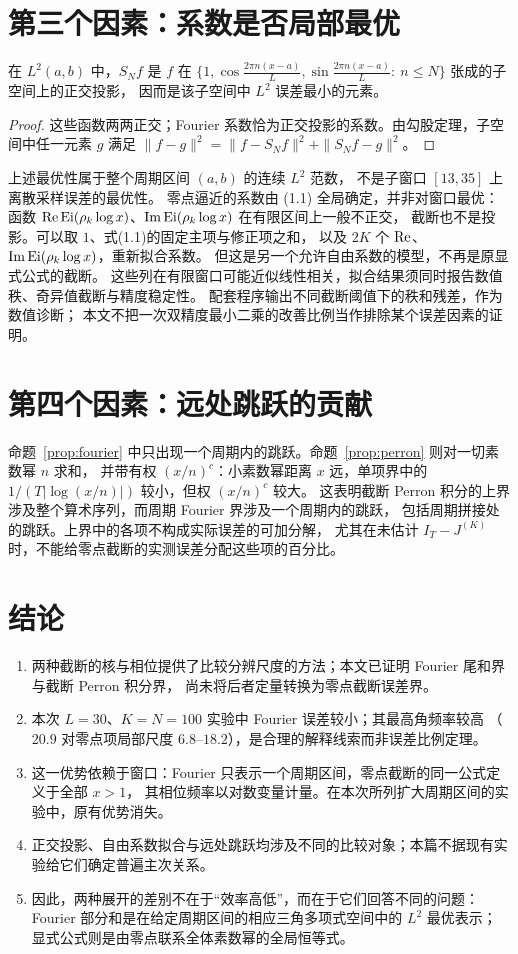 \documentclass[11pt]{article}
\newcommand{\Ei}{\operatorname{Ei}}
\begin{document}
\section{第三个因素：系数是否局部最优}
\begin{proposition}\label{prop:proj}
在 $L^2(a,b)$ 中，$S_Nf$ 是 $f$ 在 $\{1,\cos\frac{2\pi n(x-a)}L,\sin\frac{2\pi n(x-a)}L:\ n\le N\}$ 张成的子空间上的正交投影，
因而是该子空间中 $L^2$ 误差最小的元素。
\end{proposition}
\begin{proof}
这些函数两两正交；Fourier 系数恰为正交投影的系数。由勾股定理，子空间中任一元素 $g$ 满足
$\|f-g\|^2=\|f-S_Nf\|^2+\|S_Nf-g\|^2$。
\end{proof}
上述最优性属于整个周期区间 $(a,b)$ 的连续 $L^2$ 范数，
不是子窗口 $[13,35]$ 上离散采样误差的最优性。
零点逼近的系数由 (1.1) 全局确定，并非对窗口最优：函数 $\Rea\Ei(\rho_k\log x)$、$\Ima\Ei(\rho_k\log x)$ 在有限区间上一般不正交，
截断也不是投影。可以取 $1$、式(1.1)的固定主项与修正项之和，
以及 $2K$ 个 $\operatorname{Re}$、$\Ima\Ei(\rho_k\log x)$，重新拟合系数。
但这是另一个允许自由系数的模型，不再是原显式公式的截断。
这些列在有限窗口可能近似线性相关，拟合结果须同时报告数值秩、奇异值截断与精度稳定性。
配套程序输出不同截断阈值下的秩和残差，作为数值诊断；
本文不把一次双精度最小二乘的改善比例当作排除某个误差因素的证明。

\section{第四个因素：远处跳跃的贡献}
命题~\ref{prop:fourier} 中只出现一个周期内的跳跃。命题~\ref{prop:perron} 则对一切素数幂 $n$ 求和，
并带有权 $(x/n)^c$：小素数幂距离 $x$ 远，单项界中的 $1/(T|\log(x/n)|)$ 较小，但权 $(x/n)^c$ 较大。
这表明截断 Perron 积分的上界涉及整个算术序列，而周期 Fourier 界涉及一个周期内的跳跃，
包括周期拼接处的跳跃。上界中的各项不构成实际误差的可加分解，
尤其在未估计 $I_T-J^{(K)}$ 时，不能给零点截断的实测误差分配这些项的百分比。

\section{结论}
\begin{enumerate}
 \item 两种截断的核与相位提供了比较分辨尺度的方法；本文已证明 Fourier 尾和界与截断 Perron 积分界，
 尚未将后者定量转换为零点截断误差界。
 \item 本次 $L=30$、$K=N=100$ 实验中 Fourier 误差较小；其最高角频率较高
 （$20.9$ 对零点项局部尺度 $6.8$--$18.2$），是合理的解释线索而非误差比例定理。
 \item 这一优势依赖于窗口：Fourier 只表示一个周期区间，零点截断的同一公式定义于全部 $x>1$，
 其相位频率以对数变量计量。在本次所列扩大周期区间的实验中，原有优势消失。
 \item 正交投影、自由系数拟合与远处跳跃均涉及不同的比较对象；本篇不据现有实验给它们确定普遍主次关系。
 \item 因此，两种展开的差别不在于“效率高低”，而在于它们回答不同的问题：
Fourier 部分和是在给定周期区间的相应三角多项式空间中的 $L^2$ 最优表示；
显式公式则是由零点联系全体素数幂的全局恒等式。
\end{enumerate}
\end{document}
